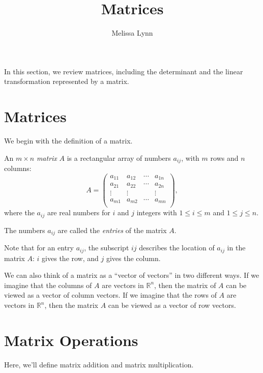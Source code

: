 \documentclass{ximera}
\title{Matrices}
\author{Melissa Lynn}
\begin{document}
  
\begin{abstract}  
\end{abstract}  
\maketitle 

In this section, we review matrices, including the determinant and the linear transformation represented by a matrix.

\section*{Matrices}

We begin with the definition of a matrix.

\begin{definition}
An $m\times n$ \emph{matrix} $A$ is a rectangular array of numbers $a_{ij}$, with $m$ rows and $n$ columns:
\[
A = \left(\begin{array}{cccc}
a_{11}& a_{12} & \cdots & a_{1n}\\
a_{21}& a_{22} & \cdots & a_{2n}\\
\vdots & \vdots & & \vdots\\
a_{m1}& a_{m2} & \cdots & a_{mn}\\
\end{array}\right), 
\]
where the $a_{ij}$ are real numbers for $i$ and $j$ integers with $1\leq i \leq m$ and $1\leq j\leq n$.

The numbers $a_{ij}$ are called the \emph{entries} of the matrix $A$.
\end{definition}

Note that for an entry $a_{ij}$, the subscript $ij$ describes the location of $a_{ij}$ in the matrix $A$: $i$ gives the row, and $j$ gives the column.

We can also think of a matrix as a ``vector of vectors'' in two different ways. If we imagine that the columns of $A$ are vectors in $\mathbb{R}^n$, then the matrix of $A$ can be viewed as a vector of column vectors. If we imagine that the rows of $A$ are vectors in $\mathbb{R}^n$, then the matrix $A$ can be viewed as a vector of row vectors.

\section*{Matrix Operations}

Here, we'll define matrix addition and matrix multiplication.
\end{document}
